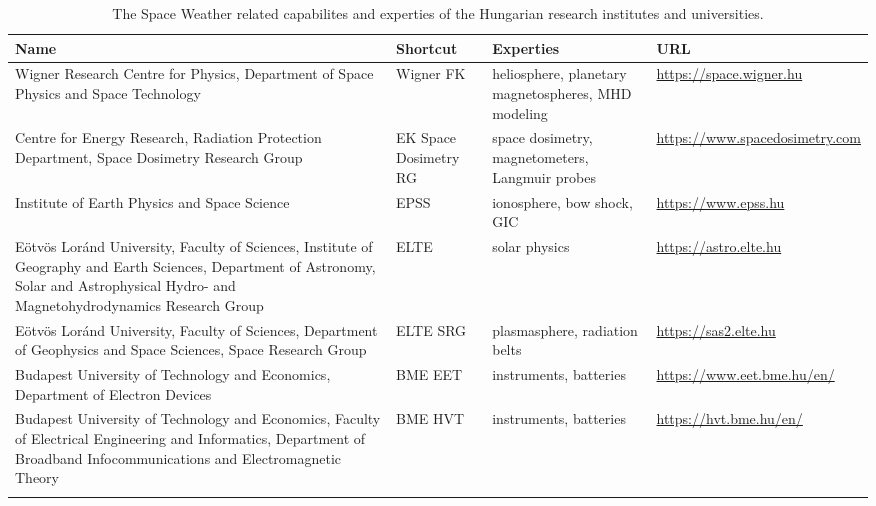 \documentclass[sn-aps]{sn-jnl}%
\begin{document}
\begin{table}[h]
\centering
\begin{tabular}[h]{p{4.5cm}p{0.75cm}p{2cm}p{2cm}}
Name & Shortcut & Experties & URL \\
\hline
\hline
Wigner Research Centre for Physics, Department of Space Physics and Space Technology & Wigner FK & heliosphere, planetary magnetospheres, MHD modeling & \url{https://space.wigner.hu} \\
\hline
Centre for Energy Research, Radiation Protection Department, Space Dosimetry Research Group & EK Space Dosimetry RG& space dosimetry, magnetometers, Langmuir probes & \url{https://www.spacedosimetry.com} \\
\hline
Institute of Earth Physics and Space Science & EPSS & ionosphere, bow shock, GIC & \url{https://www.epss.hu} \\
\hline
E{\"o}tv{\"o}s Lor{\'a}nd University, Faculty of Sciences, Institute of Geography and Earth Sciences, Department of Astronomy, Solar and Astrophysical Hydro- and Magnetohydrodynamics Research Group & ELTE & solar physics & \url{https://astro.elte.hu} \\
\hline
E{\"o}tv{\"o}s Lor{\'a}nd University, Faculty of Sciences, Department of Geophysics and Space Sciences, Space Research Group & ELTE SRG & plasmasphere, radiation belts & \url{https://sas2.elte.hu} \\
\hline
Budapest University of Technology and Economics, Department of Electron Devices & BME EET & instruments, batteries & \url{https://www.eet.bme.hu/en/} \\
\hline
Budapest University of Technology and Economics, Faculty of Electrical Engineering and Informatics, Department of Broadband Infocommunications and Electromagnetic Theory & BME HVT & instruments, batteries & \url{https://hvt.bme.hu/en/} \\ \\
\end{tabular}
\caption[Hungarian SW experties]{The Space Weather related capabilites and experties of the Hungarian research institutes and universities.} \label{tab:hunexperties}
\end{table}




\pagebreak
\end{document}
